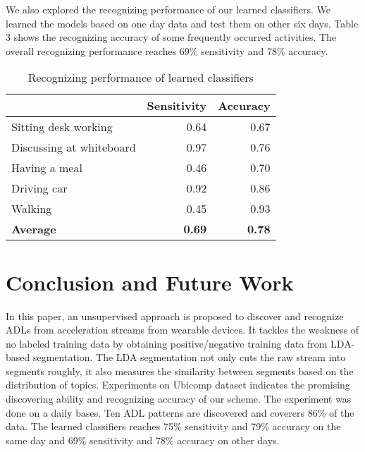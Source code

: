 \documentclass{sigchi}
\begin{document}
    We also explored the recognizing performance of our learned classifiers.
    We learned the models based on one day data and test them on other six days.
    Table 3 shows the recognizing accuracy of some frequently occurred activities.
    The overall recognizing performance reaches 69\% sensitivity and 78\% accuracy.

    \begin{table}[htbp]

    \begin{tabular}{rrr}
    \toprule
          & \textbf{Sensitivity} & \textbf{Accuracy} \\
    \midrule
    \multicolumn{1}{l}{Sitting desk working} & 0.64  & 0.67  \\
    \multicolumn{1}{l}{Discussing at whiteboard} & 0.97  & 0.76  \\
    \multicolumn{1}{l}{Having a meal} & 0.46  & 0.70  \\
    \multicolumn{1}{l}{Driving car} & 0.92  & 0.86  \\
    \multicolumn{1}{l}{Walking} & 0.45  & 0.93  \\
    \multicolumn{1}{l}{\textbf{Average}} & \textbf{0.69}  & \textbf{0.78}  \\
    \bottomrule
    \end{tabular}%
  \label{tab:model-accuracy}%
  \caption{Recognizing performance of learned classifiers}
\end{table}%

\section{Conclusion and Future Work}
\label{sec.conclusion}

    In this paper, an unsupervised approach is proposed to discover and recognize ADLs from acceleration streams from wearable devices.
    It tackles the weakness of no labeled training data by obtaining positive/negative training data from LDA-based segmentation.
    The LDA segmentation not only cuts the raw stream into segments roughly, it also measures the similarity between segments based on the distribution of topics.
    Experiments on Ubicomp dataset indicates the promising discovering ability and recognizing accuracy of our scheme.
    The experiment was done on a daily bases. Ten ADL patterns are discovered and coverers 86\% of the data.
    The learned classifiers reaches 75\% sensitivity and 79\% accuracy on the same day and 69\% sensitivity and 78\% accuracy on other days.
\end{document}
